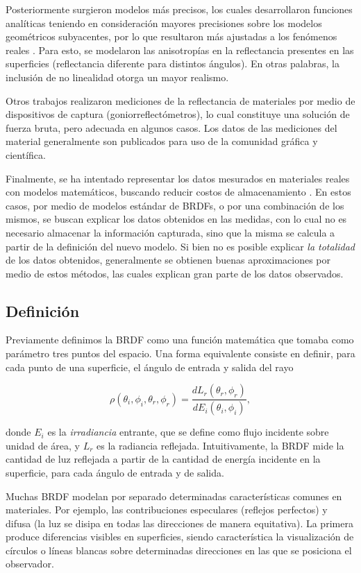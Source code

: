 Posteriormente surgieron modelos más precisos, los cuales desarrollaron funciones analíticas teniendo en consideración mayores precisiones sobre los modelos geométricos subyacentes, por lo que resultaron más ajustadas a los fenómenos reales \cite{He1991,Ward1992,Lafortune1997}.
Para esto, se modelaron las anisotropías en la reflectancia presentes en las superficies (reflectancia diferente para distintos ángulos).
En otras palabras, la inclusión de no linealidad otorga un mayor realismo.

Otros trabajos \cite{Dana1999,Matusik2003} realizaron mediciones de la reflectancia de materiales por medio de dispositivos de captura (goniorreflectómetros), lo cual constituye una solución de fuerza bruta, pero adecuada en algunos casos.
Los datos de las mediciones del material generalmente son publicados para uso de la comunidad gráfica y científica.

Finalmente, se ha intentado representar los datos mesurados en materiales reales con modelos matemáticos, buscando reducir costos de almacenamiento \cite{Ngan2005}.
En estos casos, por medio de modelos estándar de BRDFs, o por una combinación de los mismos, se buscan explicar los datos obtenidos en las medidas, con lo cual no es necesario almacenar la información capturada, sino que la misma se calcula a partir de la definición del nuevo modelo.
Si bien no es posible explicar {\em la totalidad} de los datos obtenidos, generalmente se obtienen buenas aproximaciones por medio de estos métodos, las cuales explican gran parte de los datos observados.

\subsection{Definición}
Previamente definimos la BRDF como una función matemática que tomaba como parámetro tres puntos del espacio.
Una forma equivalente consiste en definir, para cada punto de una superficie, el ángulo de entrada y salida del rayo

$$\rho(\theta_{i},\phi_{i},\theta_{r},\phi_{r}) = \frac{dL_{r}(\theta_{r},\phi_{r})}{dE_{i}(\theta_{i},\phi_{i})},$$

donde $E_{i}$ es la {\em irradiancia} entrante, que se define como flujo incidente sobre unidad de área, y $L_{r}$ es la radiancia reflejada.
Intuitivamente, la BRDF mide la cantidad de luz reflejada a partir de la cantidad de energía incidente en la superficie, para cada ángulo de entrada y de salida.

Muchas BRDF modelan por separado determinadas características comunes en materiales.
Por ejemplo, las contribuciones especulares (reflejos perfectos) y difusa (la luz se disipa en todas las direcciones de manera equitativa).
La primera produce diferencias visibles en superficies, siendo característica la visualización de círculos o líneas blancas sobre determinadas direcciones en las que se posiciona el observador.

